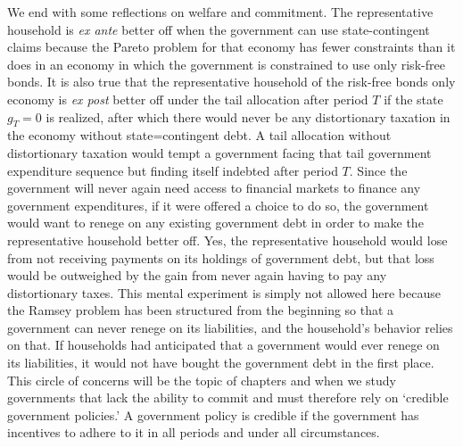 We end with some reflections on welfare and commitment. The
representative household is {\it ex ante} better off when the
government can use state-contingent claims because the
Pareto problem for that economy has fewer constraints than it does in 
an economy in which  the government is constrained
to use only risk-free bonds. It is also true that the representative
household of the risk-free bonds only economy is {\it ex post} better off under the
tail allocation after period $T$ if the state $g_T=0$ is realized,
after which there would never be any distortionary taxation in the economy
without state=contingent debt. A tail allocation without distortionary
taxation would tempt a  government facing that tail government expenditure sequence but 
finding itself
indebted after period $T$. Since the government will never again
need access to financial markets to finance any government
expenditures, if it were offered a choice to do so, the government would want  to renege on any
existing government debt in order to
make the representative household  better off. Yes,  the representative
household would lose from not receiving payments on its
holdings of government debt, but that loss would be outweighed by the
gain from never again having to pay any distortionary taxes. This mental experiment is simply not allowed here because the Ramsey 
problem has been structured from the beginning so that a government can never renege on its liabilities, and the household's
behavior relies on that. If households had anticipated that a government would ever renege on
its liabilities, it  would not have bought
the government debt in the first place. This circle of concerns will be the topic of
chapters  and  when we study governments
that lack the ability to commit and must therefore rely on
`credible government policies.' A government  policy is credible if the
government has  incentives to adhere to it in all periods and
under all circumstances.



